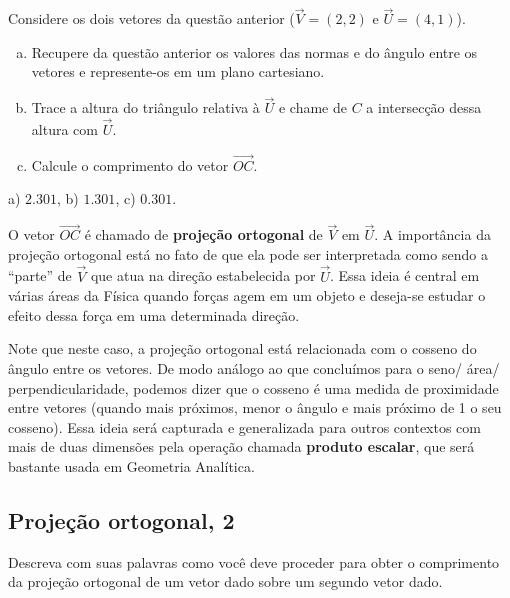 \documentclass[main.tex]{subfiles}
\begin{document}
\begin{questao}
Considere os dois vetores da questão anterior ($\overrightarrow{V}=(2,2)$ e $\overrightarrow{U}=(4,1)$).
\begin{enumerate}[a)]
\item Recupere da questão anterior os valores das normas e do ângulo entre os vetores e represente-os em um plano cartesiano.
\item Trace a altura do triângulo relativa à $\overrightarrow{U}$ e chame de $C$ a intersecção dessa altura com $\overrightarrow{U}$.
\item Calcule o comprimento do vetor $\overrightarrow{OC}$.
\end{enumerate}
\end{questao}

\begin{gabarito}
	\begin{gabaritoQuestao}
		a) $2.301$, b) $1.301$, c) $0.301$.
	\end{gabaritoQuestao}
\end{gabarito}

O vetor $\overrightarrow{OC}$ é chamado de \textbf{projeção ortogonal} de $\overrightarrow{V}$ em $\overrightarrow{U}$. A importância da projeção ortogonal está no fato de que ela pode ser interpretada como sendo a ``parte'' de $\overrightarrow{V}$ que atua na direção estabelecida por $\overrightarrow{U}$. Essa ideia é central em várias áreas da Física quando forças agem em um objeto e deseja-se estudar o efeito dessa força em uma determinada direção.

Note que neste caso, a projeção ortogonal está relacionada com o cosseno do ângulo entre os vetores. De modo análogo ao que concluímos para o seno/ área/ perpendicularidade, podemos dizer que o cosseno é uma medida de proximidade entre vetores (quando mais próximos, menor o ângulo e mais próximo de 1 o seu cosseno). Essa ideia será capturada e generalizada para outros contextos com mais de duas dimensões pela operação chamada \textbf{produto escalar}, que será bastante usada em Geometria Analítica.


\subsection*{Projeção ortogonal, 2}

\begin{reflita}
 Descreva com suas palavras como você deve proceder para obter o comprimento da projeção ortogonal de um vetor dado sobre um segundo vetor dado.
\end{reflita}
\end{document}
